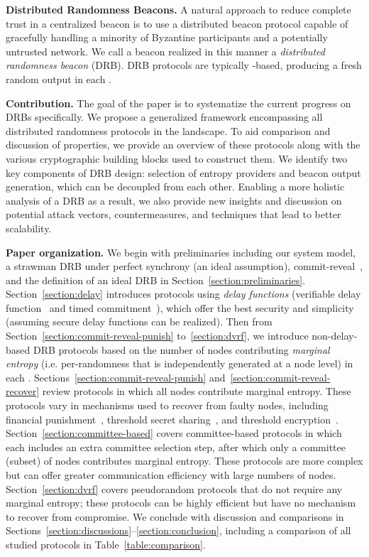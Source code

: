 \textbf{Distributed Randomness Beacons.}
A natural approach to reduce complete trust in a centralized beacon is to use a distributed beacon protocol capable of gracefully handling a minority of Byzantine participants and a potentially untrusted network. We call a beacon realized in this manner a \textit{distributed randomness beacon} (DRB). DRB protocols are typically \epoch-based, producing a fresh random output in each \epoch.

\textbf{Contribution.} The goal of the paper is to systematize the current progress on DRBs specifically. We propose a generalized framework encompassing all distributed randomness protocols in the landscape. To aid comparison and discussion of properties, we provide an overview of these protocols along with the various cryptographic building blocks used to construct them. We identify two key components of DRB design: selection of entropy providers and beacon output generation, which can be decoupled from each other. Enabling a more holistic analysis of a DRB as a result, we also provide new insights and discussion on potential attack vectors, countermeasures, and techniques that lead to better scalability.

\textbf{Paper organization.} We begin with preliminaries including our system model, a strawman DRB under perfect synchrony (an ideal assumption), commit-reveal~\cite{blum1983coin}, and the definition of an ideal DRB in Section~\ref{section:preliminaries}. Section~\ref{section:delay} introduces protocols using \textit{delay functions} (verifiable delay function~\cite{boneh2018verifiable} and timed commitment~\cite{boneh2000timed}), which offer the best security and simplicity (assuming secure delay functions can be realized). Then from Section~\ref{section:commit-reveal-punish} to~\ref{section:dvrf}, we introduce non-delay-based DRB protocols based on the number of nodes contributing \textit{marginal entropy} (i.e. per-\epoch randomness that is independently generated at a node level) in each \epoch. Sections~\ref{section:commit-reveal-punish} and~\ref{section:commit-reveal-recover} review protocols in which all nodes contribute marginal entropy. These protocols vary in mechanisms used to recover from faulty nodes, including financial punishment~\cite{youcai2017randao, david2020economically}, threshold secret sharing~\cite{schoenmakers1999simple, cascudo2017scrape}, and threshold encryption~\cite{desmedt1990Threshold}. Section~\ref{section:committee-based} covers committee-based protocols in which each \epoch includes an extra committee selection step, after which only a committee (subset) of nodes contributes marginal entropy. These protocols are more complex but can offer greater communication efficiency with large numbers of nodes. Section~\ref{section:dvrf} covers pseudorandom protocols that do not require any marginal entropy; these protocols can be highly efficient but have no mechanism to recover from compromise. We conclude with discussion and comparisons in Sections~\ref{section:discussions}--\ref{section:conclusion}, including a comparison of all studied protocols in Table~\ref{table:comparison}.

